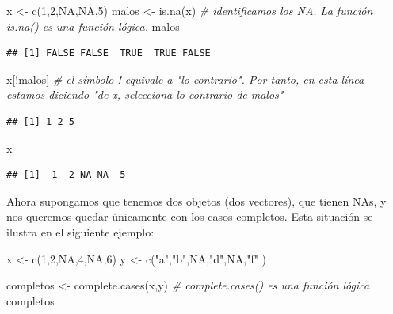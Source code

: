 \documentclass[
]{book}
\newenvironment{Shaded}{\begin{snugshade}}{\end{snugshade}}
\newcommand{\CommentTok}[1]{\textcolor[rgb]{0.56,0.35,0.01}{\textit{#1}}}
\newcommand{\ConstantTok}[1]{\textcolor[rgb]{0.00,0.00,0.00}{#1}}
\newcommand{\DecValTok}[1]{\textcolor[rgb]{0.00,0.00,0.81}{#1}}
\newcommand{\FunctionTok}[1]{\textcolor[rgb]{0.00,0.00,0.00}{#1}}
\newcommand{\NormalTok}[1]{#1}
\newcommand{\OtherTok}[1]{\textcolor[rgb]{0.56,0.35,0.01}{#1}}
\newcommand{\SpecialCharTok}[1]{\textcolor[rgb]{0.00,0.00,0.00}{#1}}
\newcommand{\StringTok}[1]{\textcolor[rgb]{0.31,0.60,0.02}{#1}}
\begin{document}
\begin{Shaded}
\begin{Highlighting}[]
\NormalTok{x }\OtherTok{\textless{}{-}} \FunctionTok{c}\NormalTok{(}\DecValTok{1}\NormalTok{,}\DecValTok{2}\NormalTok{,}\ConstantTok{NA}\NormalTok{,}\ConstantTok{NA}\NormalTok{,}\DecValTok{5}\NormalTok{)}
\NormalTok{malos }\OtherTok{\textless{}{-}} \FunctionTok{is.na}\NormalTok{(x)  }\CommentTok{\# identificamos los NA. La función is.na() es una función lógica.}
\NormalTok{malos}
\end{Highlighting}
\end{Shaded}

\begin{verbatim}
## [1] FALSE FALSE  TRUE  TRUE FALSE
\end{verbatim}

\begin{Shaded}
\begin{Highlighting}[]
\NormalTok{x[}\SpecialCharTok{!}\NormalTok{malos]  }\CommentTok{\# el símbolo ! equivale a "lo contrario". Por tanto, en esta línea estamos diciendo "de x, selecciona lo contrario de malos"}
\end{Highlighting}
\end{Shaded}

\begin{verbatim}
## [1] 1 2 5
\end{verbatim}

\begin{Shaded}
\begin{Highlighting}[]
\NormalTok{x}
\end{Highlighting}
\end{Shaded}

\begin{verbatim}
## [1]  1  2 NA NA  5
\end{verbatim}

Ahora supongamos que tenemos dos objetos (dos vectores), que tienen NAs, y nos queremos quedar únicamente con los casos completos. Esta situación se ilustra en el siguiente ejemplo:

\begin{Shaded}
\begin{Highlighting}[]
\NormalTok{x }\OtherTok{\textless{}{-}} \FunctionTok{c}\NormalTok{(}\DecValTok{1}\NormalTok{,}\DecValTok{2}\NormalTok{,}\ConstantTok{NA}\NormalTok{,}\DecValTok{4}\NormalTok{,}\ConstantTok{NA}\NormalTok{,}\DecValTok{6}\NormalTok{)}
\NormalTok{y }\OtherTok{\textless{}{-}} \FunctionTok{c}\NormalTok{(}\StringTok{"a"}\NormalTok{,}\StringTok{"b"}\NormalTok{,}\ConstantTok{NA}\NormalTok{,}\StringTok{"d"}\NormalTok{,}\ConstantTok{NA}\NormalTok{,}\StringTok{"f"}\NormalTok{ )}

\NormalTok{completos }\OtherTok{\textless{}{-}} \FunctionTok{complete.cases}\NormalTok{(x,y) }\CommentTok{\# complete.cases() es una función lógica}
\NormalTok{completos}
\end{Highlighting}
\end{Shaded}
\end{document}
